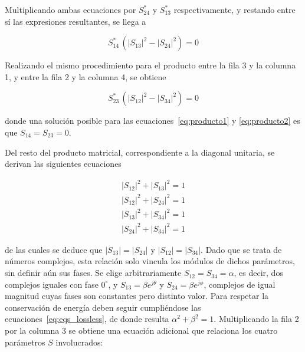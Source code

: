 Multiplicando ambas ecuaciones por $S_{24}^*$ y $S_{13}^*$ respectivamente, y restando entre sí las expresiones resultantes, se llega a

\vspace{-0.5cm}
\begin{equation}
    S_{14}^*\,(\lvert S_{13} \rvert^2 - \lvert S_{24} \rvert^2)=0
\label{eq:producto1}
\end{equation}

Realizando el mismo procedimiento para el producto entre la fila 3 y la columna 1, y entre la fila 2 y la columna 4, se obtiene

\vspace{-0.5cm}
\begin{equation}
    S_{23}^*\,( \lvert S_{12} \rvert^2 - \lvert S_{34} \rvert^2)=0
\label{eq:producto2}
\end{equation}

donde una solución posible para las ecuaciones~\eqref{eq:producto1} y \eqref{eq:producto2} es que $S_{14}=S_{23}=0$.

Del resto del producto matricial, correspondiente a la diagonal unitaria, se derivan las siguientes ecuaciones

\begin{subequations}
    \begin{align}
        \lvert S_{12} \rvert^2 + \lvert S_{13} \rvert^2 = 1 \\
        \lvert S_{12} \rvert^2 + \lvert S_{24} \rvert^2 = 1 \\
        \lvert S_{13} \rvert^2 + \lvert S_{34} \rvert^2 = 1 \\
        \lvert S_{24} \rvert^2 + \lvert S_{34} \rvert^2 = 1
    \end{align}
    \label{eq:eqs_lossless}
\end{subequations}
\vspace{-0.5cm}

de las cuales se deduce que $\lvert S_{13} \rvert = \lvert S_{24} \rvert$ y $\lvert S_{12} \rvert = \lvert S_{34} \rvert$. Dado que se trata de números complejos, esta relación solo vincula los módulos de dichos parámetros, sin definir aún sus fases. Se elige arbitrariamente $S_{12}=S_{34}=\alpha$, es decir, dos complejos iguales con fase $0^\circ$, y $S_{13}=\beta e^{j\theta}$ y $S_{24}=\beta e^{j\phi}$, complejos de igual magnitud cuyas fases son constantes pero distinto valor. Para respetar la conservación de energía deben seguir cumpliéndose las ecuaciones~\eqref{eq:eqs_lossless}, de donde resulta $\alpha^2 + \beta^2 = 1$. Multiplicando la fila 2 por la columna 3 se obtiene una ecuación adicional que relaciona los cuatro parámetros $S$ involucrados:

